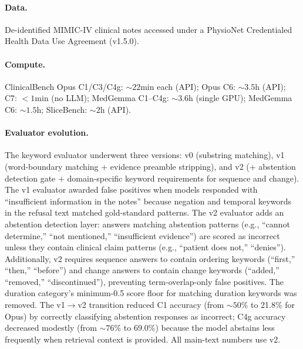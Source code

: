 \paragraph{Data.} De-identified MIMIC-IV clinical notes accessed under a PhysioNet Credentialed Health Data Use Agreement (v1.5.0).

\paragraph{Compute.} ClinicalBench Opus C1/C3/C4g: ${\sim}22$min each (API); Opus C6: ${\sim}3.5$h (API); C7: $<1$min (no LLM); MedGemma C1--C4g: ${\sim}3.6$h (single GPU); MedGemma C6: ${\sim}1.5$h; SliceBench: ${\sim}2$h (API).

\paragraph{Evaluator evolution.} The keyword evaluator underwent three versions: v0 (substring matching), v1 (word-boundary matching + evidence preamble stripping), and v2 (+ abstention detection gate + domain-specific keyword requirements for sequence and change). The v1 evaluator awarded false positives when models responded with ``insufficient information in the notes'' because negation and temporal keywords in the refusal text matched gold-standard patterns. The v2 evaluator adds an abstention detection layer: answers matching abstention patterns (e.g., ``cannot determine,'' ``not mentioned,'' ``insufficient evidence'') are scored as incorrect unless they contain clinical claim patterns (e.g., ``patient does not,'' ``denies''). Additionally, v2 requires sequence answers to contain ordering keywords (``first,'' ``then,'' ``before'') and change answers to contain change keywords (``added,'' ``removed,'' ``discontinued''), preventing term-overlap-only false positives. The duration category's minimum-0.5 score floor for matching duration keywords was removed.
The v1$\to$v2 transition reduced C1 accuracy (from ${\sim}50\%$ to 21.8\% for Opus) by correctly classifying abstention responses as incorrect; C4g accuracy decreased modestly (from ${\sim}76\%$ to 69.0\%) because the model abstains less frequently when retrieval context is provided.
All main-text numbers use v2.

